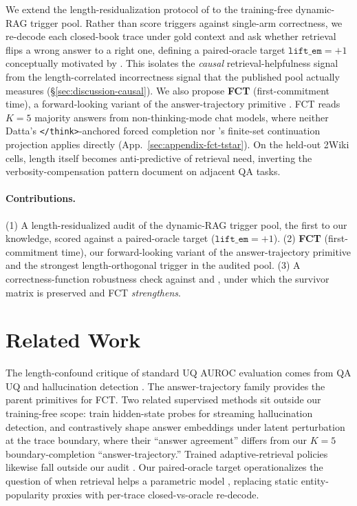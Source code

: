 \documentclass[11pt]{article}
\begin{document}
We extend the length-residualization protocol of \citet{vashurin_uncertainty-line_2025} to the training-free dynamic-RAG trigger pool. Rather than score triggers against single-arm correctness, we re-decode each closed-book trace under gold context and ask whether retrieval flips a wrong answer to a right one, defining a paired-oracle target $\texttt{lift\_em}{=}+1$ conceptually motivated by \citet{mallen_when_2023}. This isolates the \emph{causal} retrieval-helpfulness signal from the length-correlated incorrectness signal that the published pool actually measures (\S\ref{sec:discussion-causal}). We also propose \textbf{FCT} (first-commitment time), a forward-looking variant of the answer-trajectory primitive \citep{datta_large_2026, wang_chain--probe_nodate, chen_i_2026, zhang_commit_2026}. FCT reads $K{=}5$ majority answers from non-thinking-mode chat models, where neither Datta's \texttt{</think>}-anchored forced completion nor \citeauthor{zhang_commit_2026}'s finite-set continuation projection applies directly (App.~\ref{sec:appendix-fct-tstar}). On the held-out 2Wiki cells, length itself becomes anti-predictive of retrieval need, inverting the verbosity-compensation pattern \citet{zhang_verbosity_2024} document on adjacent QA tasks.

\paragraph{Contributions.} (1) A length-residualized audit of the dynamic-RAG trigger pool, the first to our knowledge, scored against a paired-oracle target ($\texttt{lift\_em}{=}+1$). (2) \textbf{FCT} (first-commitment time), our forward-looking variant of the answer-trajectory primitive and the strongest length-orthogonal trigger in the audited pool. (3) A correctness-function robustness check against \citet{janiak_illusion_nodate} and \citet{ielanskyi_addressing_2025}, under which the survivor matrix is preserved and FCT \emph{strengthens}.

\section{Related Work}
\label{sec:related}

The length-confound critique of standard UQ AUROC evaluation comes from QA UQ and hallucination detection \citep{santilli_revisiting_2025, janiak_illusion_nodate, zhang_verbosity_2024, ielanskyi_addressing_2025, vashurin_uncertainty-line_2025, mao_confidence_2026}. The answer-trajectory family \citep{datta_large_2026, wang_chain--probe_nodate, chen_i_2026} provides the parent primitives for FCT. Two related supervised methods sit outside our training-free scope: \citet{lu_streaming_2026} train hidden-state probes for streaming hallucination detection, and \citet{zhang_harnessing_2026} contrastively shape answer embeddings under latent perturbation at the trace boundary, where their ``answer agreement'' differs from our $K{=}5$ boundary-completion ``answer-trajectory.'' Trained adaptive-retrieval policies likewise fall outside our audit \citep{asai_self-rag_2023, guo_dior_2025}. Our paired-oracle target operationalizes the question of when retrieval helps a parametric model \citep{mallen_when_2023}, replacing static entity-popularity proxies with per-trace closed-vs-oracle re-decode.
\end{document}
